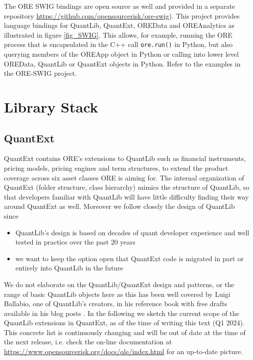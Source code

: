 \documentclass[12pt, a4paper]{report}
\begin{document}
The ORE SWIG bindings are open source as well and provided in a separate repository \url{https://github.com/opensourcerisk/ore-swig}). This project provides language bindings for QuantLib, QuantExt, OREData and OREAnalytics as illustrated in figure 
\ref{fig_SWIG}. This allows, for example, running the ORE process that is encapsulated in the C++ call {\tt ore.run()} in Python, but also querying members of the OREApp object in Python or calling into lower level OREData, QuantLib or QuantExt objects in Python. Refer to the examples in the ORE-SWIG project.

\section{Library Stack} 

\subsection{QuantExt}
QuantExt contains ORE's extensions to QuantLib such as financial instruments, pricing models, pricing engines and term structures, to extend the product coverage across six
asset classes ORE is aiming for. The internal organization of QuantExt (folder structure, class hierarchy) mimics the structure of QuantLib, so that developers familiar with QuantLib will have little difficulty finding their way around QuantExt as well.
Moreover we follow closely the design of QuantLib since
\begin{itemize}
\item QuantLib's design is based on decades of quant developer experience and well tested in practice over the past 20 years
\item we want to keep the option open that QuantExt code is migrated in part or entirely into QuantLib in the future
\end{itemize}

We do not elaborate on the QuantLib/QuantExt design and patterns, or the range of basic QuantLib objects here as this has been well covered by Luigi Ballabio, one of QuantLib's creators, in his reference book \cite{ballabio_book} with free drafts available in his blog posts \cite{ballabio_blog}.
In the following we sketch the current scope of the QuantLib extensions in QuantExt, as of the time of writing this text (Q1 2024). 
This concrete list is continuously changing and will be out of date at the time of the next release, i.e. check the on-line documentation at \url{https://www.opensourcerisk.org/docs/qle/index.html} for an up-to-date picture.
\end{document}
